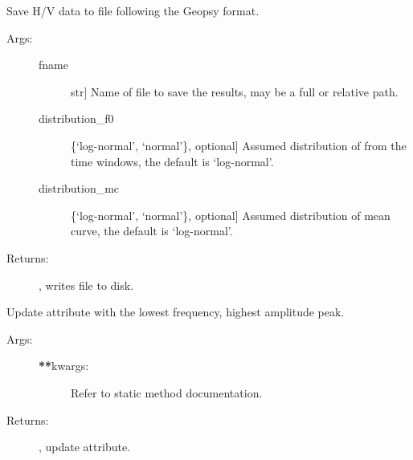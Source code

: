 \documentclass[letterpaper,10pt,english,openany,oneside]{sphinxmanual}
\begin{document}
\begin{fulllineitems}
\begin{fulllineitems}
\label{\detokenize{index:hvsrpy.Hvsr.to_file_like_geopsy}}
Save H/V data to file following the Geopsy format.
\begin{description}
\item[{Args:}] \leavevmode\begin{description}
\item[{fname}] \leavevmode{[}str{]}
Name of file to save the results, may be a full or
relative path.

\item[{distribution\_f0}] \leavevmode{[}\{‘log-normal’, ‘normal’\}, optional{]}
Assumed distribution of  from the time windows, the
default is ‘log-normal’.

\item[{distribution\_mc}] \leavevmode{[}\{‘log-normal’, ‘normal’\}, optional{]}
Assumed distribution of mean curve, the default is
‘log-normal’.

\end{description}

\item[{Returns:}] \leavevmode
{}, writes file to disk.

\end{description}

\end{fulllineitems}


\begin{fulllineitems}
\label{\detokenize{index:hvsrpy.Hvsr.update_peaks}}
Update  attribute with the lowest frequency, highest
amplitude peak.
\begin{description}
\item[{Args:}] \leavevmode\begin{description}
\item[{{\color{red}\bfseries{}**}kwargs:}] \leavevmode
Refer to static method  documentation.

\end{description}

\item[{Returns:}] \leavevmode
{}, update  attribute.

\end{description}

\end{fulllineitems}


\end{fulllineitems}




\renewcommand{\indexname}{Index}
\printindex
\end{document}
